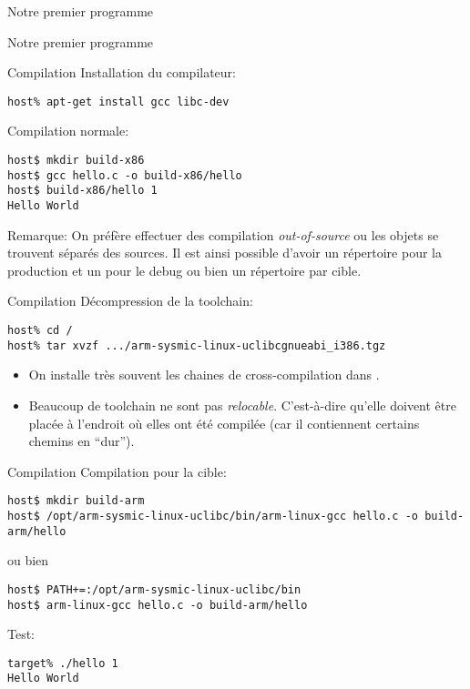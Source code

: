 \begin{frame}[fragile=singleslide]{Notre premier programme}{}
  
\end{frame}

\begin{frame}[fragile=singleslide]{Notre premier programme}{}
  
\end{frame}

\begin{frame}[fragile=singleslide]{Compilation}
  Installation du compilateur:
  \begin{lstlisting}
host% apt-get install gcc libc-dev
  \end{lstlisting}
  Compilation normale:
  \begin{lstlisting}
host$ mkdir build-x86
host$ gcc hello.c -o build-x86/hello
host$ build-x86/hello 1
Hello World
\end{lstlisting} %
Remarque: On préfère effectuer des compilation \emph{out-of-source} ou
les objets  se trouvent  séparés des sources.   Il est  ainsi possible
d'avoir un répertoire  pour la production et un pour  le debug ou bien
un répertoire par cible.
\end{frame}

\begin{frame}[fragile=singleslide]{Compilation}
  Décompression de la toolchain:
  \begin{lstlisting} 
host% cd /
host% tar xvzf .../arm-sysmic-linux-uclibcgnueabi_i386.tgz
  \end{lstlisting}
  \begin{itemize} 
  \item   On  installe  très souvent  les  chaines  de cross-compilation  dans
    . 
  \item      Beaucoup      de      toolchain     ne      sont      pas
    \emph{relocable}.  C'est-à-dire  qu'elle  doivent  être  placée  à
    l'endroit où  elles ont été compilée (car  il contiennent certains
    chemins en ``dur'').
  \end{itemize}
\end{frame}

\begin{frame}[fragile=singleslide]{Compilation}
  Compilation pour la cible:
  \begin{lstlisting}
host$ mkdir build-arm
host$ /opt/arm-sysmic-linux-uclibc/bin/arm-linux-gcc hello.c -o build-arm/hello
  \end{lstlisting} 
  ou bien
  \begin{lstlisting} 
host$ PATH+=:/opt/arm-sysmic-linux-uclibc/bin
host$ arm-linux-gcc hello.c -o build-arm/hello
  \end{lstlisting}
  Test:
  \begin{lstlisting} 
target% ./hello 1
Hello World
  \end{lstlisting} %
\end{frame}

